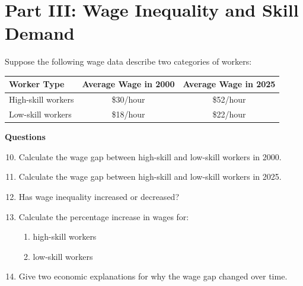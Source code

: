 \documentclass[12pt]{article}
\begin{document}
\newpage

\section*{Part III: Wage Inequality and Skill Demand}

Suppose the following wage data describe two categories of workers:

\begin{center}
\begin{tabular}{lcc}
\toprule
Worker Type & Average Wage in 2000 & Average Wage in 2025 \\
\midrule
High-skill workers & \$30/hour & \$52/hour \\
Low-skill workers & \$18/hour & \$22/hour \\
\bottomrule
\end{tabular}
\end{center}

\textbf{Questions}

\begin{enumerate}[label=\arabic*.]
\setcounter{enumi}{9}
\item Calculate the wage gap between high-skill and low-skill workers in 2000.
\vspace{1.5cm}

\item Calculate the wage gap between high-skill and low-skill workers in 2025.
\vspace{1.5cm}

\item Has wage inequality increased or decreased?
\vspace{1.5cm}

\item Calculate the percentage increase in wages for:
\begin{enumerate}[label=(\alph*)]
\item high-skill workers
\item low-skill workers
\end{enumerate}
\vspace{2.5cm}

\item Give two economic explanations for why the wage gap changed over time.
\vspace{2.5cm}
\end{enumerate}

\newpage

\end{document}
